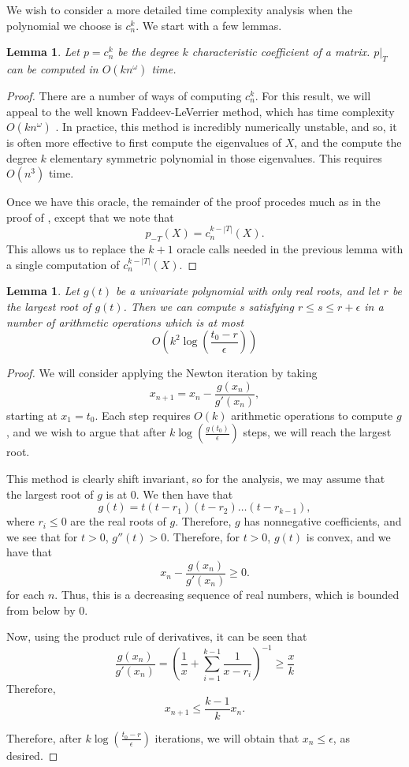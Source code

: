\documentclass{amsart}
\newtheorem{lemma}[theorem]{Lemma}
\theoremstyle{definition}
\begin{document}
We wish to consider a more detailed time complexity analysis when the polynomial we choose is $c_n^k$. We start with a few lemmas.
\begin{lemma}
    \label{lem:char_comp}
    Let $p = c_n^k$ be the degree $k$ characteristic coefficient of a matrix. $p|_T$ can be computed in $O(kn^{\omega})$ time.
\end{lemma}
\begin{proof}
    There are a number of ways of computing $c_n^k$. For this result, we will appeal to the well known Faddeev-LeVerrier method, which has time complexity $O(kn^{\omega})$ \cite{baer2021faddeev}. In practice, this method is incredibly numerically unstable, and so, it is often more effective to first compute the eigenvalues of $X$, and the compute the degree $k$ elementary symmetric polynomial in those eigenvalues. This requires $O(n^3)$ time.

    Once we have this oracle, the remainder of the proof procedes much as in the proof of , except that we note that
    \[
        p_{-T}(X) = c_n^{k-|T|}(X).
    \]
    This allows us to replace the $k+1$ oracle calls needed in the previous lemma with a single computation of $c_n^{k-|T|}(X)$.
\end{proof}

\begin{lemma}
    \label{lem:newton}
    Let $g(t)$ be a univariate polynomial with only real roots, and let $r$ be the largest root of $g(t)$.
    Then we can compute $s$ satisfying $r \le s \le r + \epsilon$ in a number of arithmetic operations which is at most
    \[
        O(k^2\log(\frac{t_0-r}{\epsilon}))
    \]
\end{lemma}
\begin{proof}
    We will consider applying the Newton iteration by taking
    \[
        x_{n+1} = x_n - \frac{g(x_n)}{g'(x_n)},
    \]
    starting at $x_1 = t_0$. Each step requires $O(k)$ arithmetic operations to compute $g$, and we wish to argue that after $k\log(\frac{g(t_0)}{\epsilon})$ steps, we will reach the largest root.

    This method is clearly shift invariant, so for the analysis, we may assume that the largest root of $g$ is at 0. We then have that
    \[
        g(t) = t(t-r_1)(t - r_2)\dots(t-r_{k-1}),
    \]
    where $r_i \le 0$ are the real roots of $g$. Therefore, $g$ has nonnegative coefficients, and we see that for $t > 0$, $g''(t) > 0$.
    Therefore, for $t > 0$, $g(t)$ is convex, and we have that
    \[
        x_n - \frac{g(x_n)}{g'(x_n)} \ge 0.
    \]
    for each $n$. Thus, this is a decreasing sequence of real numbers, which is bounded from below by 0.

    Now, using the product rule of derivatives, it can be seen that
    \[
        \frac{g(x_n)}{g'(x_n)} = \left( \frac{1}{x}+\sum_{i = 1}^{k-1} \frac{1}{x-r_i} \right)^{-1} \ge \frac{x}{k}
    \]
    Therefore,
    \[
        x_{n+1} \le \frac{k-1}{k}x_n.
    \]

    Therefore, after $k\log(\frac{t_0-r}{\epsilon})$ iterations, we will obtain that $x_{n} \le \epsilon$, as desired.
\end{proof}
\end{document}
